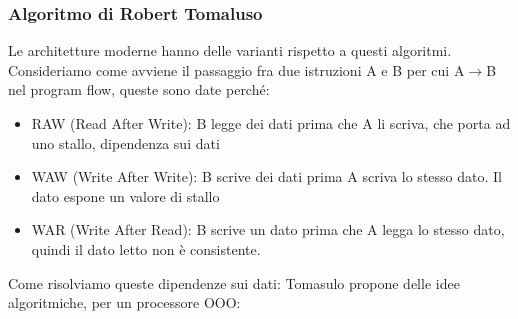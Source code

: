 \documentclass[14pt]{article}
\begin{document}
\subsubsection{Algoritmo di Robert Tomaluso}
Le architetture moderne hanno delle varianti rispetto a questi algoritmi. Consideriamo come avviene il passaggio fra due istruzioni A e B per cui A$\rightarrow$B nel program flow, queste sono date perché:
\begin{itemize}
\item RAW (Read After Write): B legge dei dati prima che A li scriva, che porta ad uno stallo, dipendenza sui dati
\item WAW (Write After Write): B scrive dei dati prima A scriva lo stesso dato. Il dato espone un valore di stallo
\item WAR (Write After Read): B scrive un dato prima che A legga lo stesso dato, quindi il dato letto non è consistente.
\end{itemize}
Come risolviamo queste dipendenze sui dati: Tomasulo propone delle idee algoritmiche, per un processore OOO:
\end{document}
